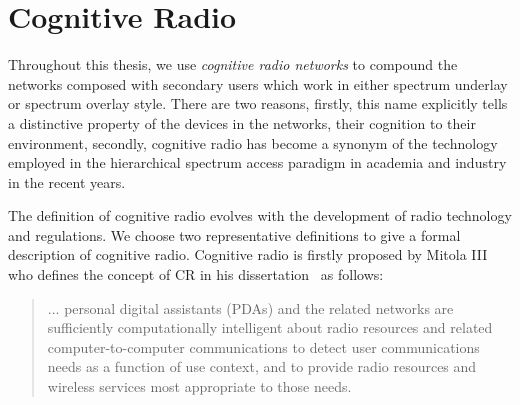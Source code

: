 





\section{Cognitive Radio}


Throughout this thesis, we use \textit{cognitive radio networks} to compound the networks composed with secondary users which work in either spectrum underlay or spectrum overlay style.
There are two reasons, firstly, this name explicitly tells a distinctive property of the devices in the networks, their cognition to their environment, secondly, cognitive radio has become a synonym of the technology employed in the hierarchical spectrum access paradigm in academia and industry in the recent years.




The definition of cognitive radio evolves with the development of radio technology and regulations.
We choose two representative definitions to give a formal description of cognitive radio.
Cognitive radio is firstly proposed by Mitola III who defines the concept of CR in his dissertation~\cite{2000mitola_cognitive_radio} as follows:
%
\blockquote{... personal digital assistants (PDAs) and the related networks are sufficiently computationally intelligent about radio resources and related computer-to-computer communications to detect user communications needs as a function of use context, and to provide radio resources and wireless services most appropriate to those needs.
}

